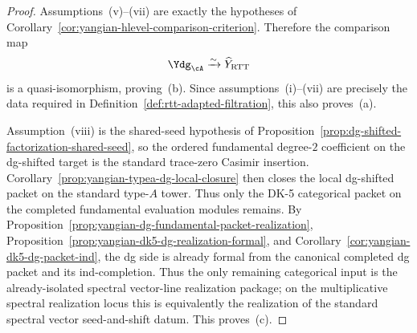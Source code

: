 \begin{proof}
Assumptions~\textup{(v)}--\textup{(vii)} are exactly the hypotheses of
Corollary~\ref{cor:yangian-hlevel-comparison-criterion}. Therefore the
comparison map
\[
\Ydg_{\cA}\xrightarrow{\sim}\widehat Y_{\mathrm{RTT}}
\]
is a quasi-isomorphism, proving~\textup{(b)}. Since
assumptions~\textup{(i)}--\textup{(vii)} are precisely the data
required in Definition~\ref{def:rtt-adapted-filtration}, this also
proves~\textup{(a)}.

Assumption~\textup{(viii)} is the shared-seed hypothesis of
Proposition~\ref{prop:dg-shifted-factorization-shared-seed}, so the
ordered fundamental degree-$2$ coefficient on the dg-shifted target is
the standard trace-zero Casimir insertion. Corollary~\ref{prop:yangian-typea-dg-local-closure}
then closes the local dg-shifted packet on the standard type-$A$
tower. Thus only the DK-5 categorical packet on the completed
fundamental evaluation modules remains. By
Proposition~\ref{prop:yangian-dg-fundamental-packet-realization},
Proposition~\ref{prop:yangian-dk5-dg-realization-formal}, and
Corollary~\ref{cor:yangian-dk5-dg-packet-ind}, the dg side is already
formal from the canonical completed dg packet and its ind-completion.
Thus the only remaining categorical input is the already-isolated
spectral vector-line realization package; on the multiplicative
spectral realization locus this is equivalently the realization of the
standard spectral vector seed-and-shift datum.
This proves~\textup{(c)}.
\end{proof}

